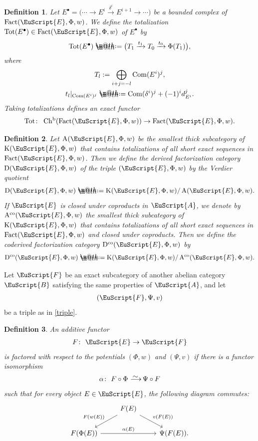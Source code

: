 \documentclass[10pt,a4paper]{amsart}
\makeatletter
\newtheorem{dfn}{Definition}[section]
\newcommand*{\defeq}{\mathrel{\rlap{%
 \raisebox{0.3ex}{$\m@th\cdot$}}%
 \raisebox{-0.3ex}{$\m@th\cdot$}}%
 =}
\numberwithin{equation}{section}
\newcommand{\Chb}{\operatorname{Ch^{b}}}
\newcommand{\Fact}{\operatorname{Fact}}
\newcommand{\Tot}{\operatorname{Tot}}
\newcommand{\Dco}{\operatorname{D^{co}}}
\newcommand{\D}{\operatorname{D}}
\newcommand{\Aco}{\operatorname{A^{co}}}
\newcommand{\A}{\operatorname{A}}
\newcommand{\K}{\operatorname{K}}
\newcommand{\scrA}{\EuScript{A}}
\newcommand{\scrB}{\EuScript{B}}
\newcommand{\scrE}{\EuScript{E}}
\newcommand{\scrF}{\EuScript{F}}
\newcommand{\simto}{\,\,\,\,\raisebox{4pt}{$\sim$}{\kern -1.1em \longrightarrow}\,}
\makeatother
\begin{document}
\begin{dfn}
Let $E^{\bullet}=\big(\cdots\rightarrow E^i\xrightarrow{\delta^i}E^{i+1}\rightarrow\cdots\big)$ be a bounded complex of $\Fact(\scrE,\Phi,w)$. We define the {\it totalization} $\Tot(E^{\bullet})\in\Fact(\scrE,\Phi,w)$ of $E^{\bullet}$ by
\begin{gather*}
{\rm Tot}(E^{\bullet})\defeq\big(T_1\xrightarrow{t_1}T_0\xrightarrow{t_0}\Phi(T_1)\big),
\end{gather*}
where
\begin{gather*}
T_l:=\bigoplus_{i+j=-l}{\rm Com}(E^i)^j,
\\
t_l|_{{\rm Com}(E^i)^j}\defeq{\rm Com}(\delta^i)^j+(-1)^id_{E^i}^j.
\end{gather*}
Taking totalizations defines an exact functor
\begin{gather*}
\Tot\colon\ \Chb(\Fact(\scrE,\Phi,w))\rightarrow \Fact(\scrE,\Phi,w).
\end{gather*}
\end{dfn}

\begin{dfn}
Let $\A(\scrE,\Phi,w)$ be the smallest thick subcategory of $\K(\scrE,\Phi,w)$ that contains tota\-lizations of all short exact sequences in $\Fact(\scrE,\Phi,w)$. Then we define the {\it derived factorization category} $\D(\scrE,\Phi,w)$ of the triple $(\scrE,\Phi,w)$ by the Verdier quotient
\begin{gather*}
\D(\scrE,\Phi,w)\defeq\K(\scrE,\Phi,w)/\A(\scrE,\Phi,w).
\end{gather*}
If $\scrE$ is closed under coproducts in $\scrA$, we denote by
$\Aco(\scrE,\Phi,w)$ the smallest thick subcategory of $\K(\scrE,\Phi,w)$ that contains totalizations of all short exact sequences in $\Fact(\scrE,\Phi,w)$ and closed under coproducts. Then we define the {\it coderived factorization category} $\Dco(\scrE,\Phi,w)$ by
\begin{gather*}
\Dco(\scrE,\Phi,w)\defeq\K(\scrE,\Phi,w)/\Aco(\scrE,\Phi,w).
\end{gather*}
\end{dfn}

Let $\scrF$ be an exact subcategory of another abelian category $\scrB$ satisfying the same properties of $\scrA$, and let
\begin{gather*}
(\scrF,\Psi,v)
\end{gather*} be a triple as in \eqref{triple}.

\begin{dfn} An additive functor
\begin{gather*}
F\colon\ \scrE \to \scrF
\end{gather*}
is {\it factored} with respect to the potentials $(\Phi,w)$ and $(\Psi,v)$ if there is a functor isomorphism
\begin{gather*}
\alpha\colon\ F\circ \Phi \simto \Psi\circ F
\end{gather*}
such that for every object $E\in \scrE$, the following diagram commutes:
\[
\begin{tikzcd}
&F(E)\arrow[ld, "F(w(E))"']\arrow[rd, "v(F(E))"]&\\
F(\Phi(E))\arrow[rr, "\alpha(E)"]&& \Psi(F(E)).
\end{tikzcd}
\]
\end{dfn}
\end{document}
